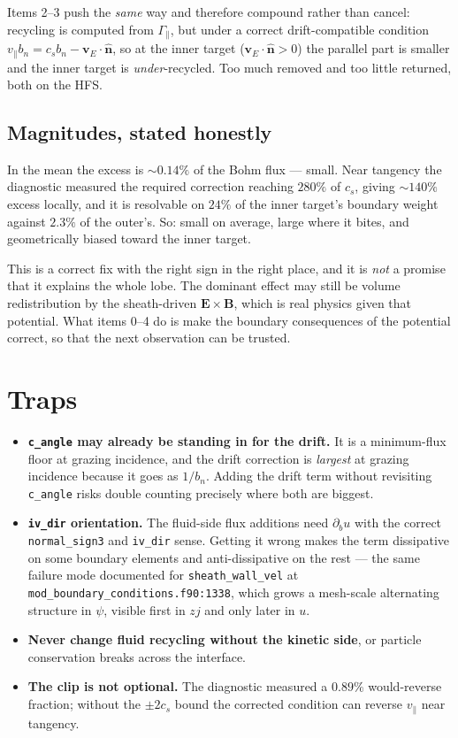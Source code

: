 \documentclass[11pt,a4paper]{article}
\newcommand{\code}[1]{\texttt{\small #1}}
\newcommand{\vE}{\bm v_E}\newcommand{\nhat}{\hat{\bm n}}\newcommand{\that}{\hat{\bm t}}
\begin{document}
Items 2--3 push the \emph{same} way and therefore compound rather than cancel: recycling is
computed from $\Gamma_\parallel$, but under a correct drift-compatible condition
$v_\parallel b_n = c_s b_n - \vE\!\cdot\!\nhat$, so at the inner target ($\vE\!\cdot\!\nhat>0$)
the parallel part is smaller and the inner target is \emph{under}-recycled. Too much removed
and too little returned, both on the HFS.

\subsection*{Magnitudes, stated honestly}

In the mean the excess is $\sim0.14\%$ of the Bohm flux --- small. Near tangency the
diagnostic measured the required correction reaching $280\%$ of $c_s$, giving $\sim140\%$
excess locally, and it is resolvable on $24\%$ of the inner target's boundary weight against
$2.3\%$ of the outer's. So: small on average, large where it bites, and geometrically biased
toward the inner target.

\begin{caution}
This is a correct fix with the right sign in the right place, and it is \emph{not} a promise
that it explains the whole lobe. The dominant effect may still be volume redistribution by
the sheath-driven $\bm E\times\bm B$, which is real physics given that potential. What items
0--4 do is make the boundary consequences of the potential correct, so that the next
observation can be trusted.
\end{caution}

\section{Traps}

\begin{itemize}\itemsep3pt
\item \textbf{\code{c\_angle} may already be standing in for the drift.} It is a minimum-flux
floor at grazing incidence, and the drift correction is \emph{largest} at grazing incidence
because it goes as $1/b_n$. Adding the drift term without revisiting \code{c\_angle} risks
double counting precisely where both are biggest.
\item \textbf{\code{iv\_dir} orientation.} The fluid-side flux additions need
$\partial_b u$ with the correct \code{normal\_sign3} and \code{iv\_dir} sense. Getting it
wrong makes the term dissipative on some boundary elements and anti-dissipative on the rest
--- the same failure mode documented for \code{sheath\_wall\_vel} at
\code{mod\_boundary\_conditions.f90:1338}, which grows a mesh-scale alternating structure in
$\psi$, visible first in $zj$ and only later in $u$.
\item \textbf{Never change fluid recycling without the kinetic side}, or particle
conservation breaks across the interface.
\item \textbf{The clip is not optional.} The diagnostic measured a $0.89\%$ would-reverse
fraction; without the $\pm2c_s$ bound the corrected condition can reverse $v_\parallel$ near
tangency.
\end{itemize}
\end{document}
